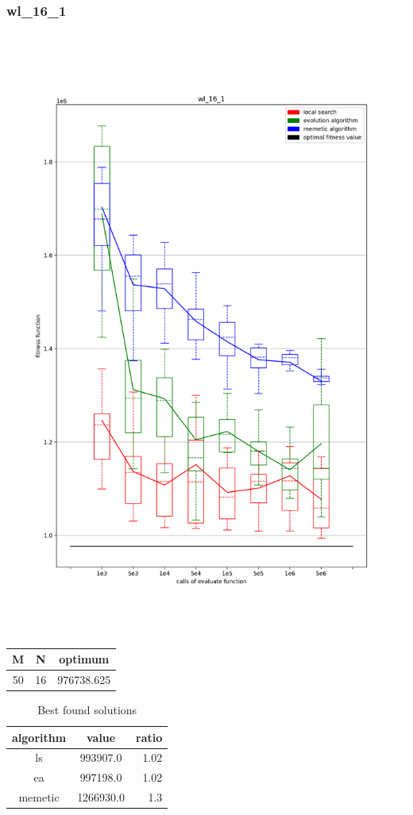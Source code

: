 \documentclass{beamer}
\begin{document}
\begin{frame}
    \frametitle{wl\_16\_1}
    \begin{minipage}{0.5\textwidth}
        \includegraphics[width=\textwidth]{wl_16_1.png}
    \end{minipage}
    \begin{minipage}{0.4\textwidth}
        \begin{tabular}{ c | c | c }
            M & N & optimum \\
            \hline
            50 & 16 & 976738.625 \\
        \end{tabular}
        \begin{table}
            \centering
            \begin{tabular}{ c | c | r }
                algorithm & value & ratio \\
                \hline
                ls & 993907.0 & 1.02 \\
                ea & 997198.0 & 1.02 \\
                memetic & 1266930.0 & 1.3 \\
            \end{tabular}
            \caption{Best found solutions}
        \end{table}
    \end{minipage}
\end{frame}
\end{document}
